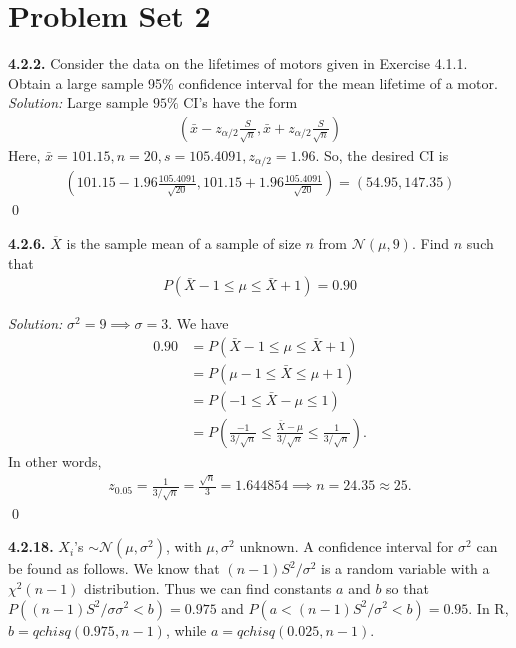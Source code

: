 \documentclass{book}
\theoremstyle{definition}
\newcommand{\nn}{\nonumber}
\newcommand{\N}{\mathcal{N}}
\newcommand{\f}[2]{\frac{#1}{#2}}
\newcommand{\lp}{\left(}
\newcommand{\rp}{\right)}
\begin{document}
\newpage

\section{Problem Set 2}




\noindent \textbf{4.2.2.} Consider the data on the lifetimes of motors given in Exercise 4.1.1. Obtain
a large sample 95\% confidence interval for the mean lifetime of a motor.\\

\noindent \textit{Solution:} Large sample $95\%$ CI's have the form
\begin{align}
(\bar{x}- z_{\alpha/2}\f{S}{\sqrt{n}} , \bar{x}+ z_{\alpha/2}\f{S}{\sqrt{n}})
\end{align}
Here, $\bar{x} = 101.15, n= 20, s = 105.4091, z_{\alpha/2} = 1.96$. So, the desired CI is
\begin{align}
(101.15- 1.96\f{105.4091}{\sqrt{20}} , 101.15+ 1.96\f{105.4091}{\sqrt{20}}) = \boxed{(54.95, 147.35)}
\end{align}\qed





\newpage
\noindent\textbf{4.2.6.} $\overline{X}$ is the sample mean of a sample of size $n$ from $\N(\mu,9)$. Find $n$ such that 
\begin{align}
P(\bar{X}-1\leq \mu \leq \bar{X}+1) = 0.90
\end{align}

\noindent \textit{Solution:}  $\sigma^2 = 9 \implies \sigma = 3$. We have
\begin{align}
0.90 &= P( \bar{X} - 1\leq \mu \leq \bar{X} + 1 )\nn\\
&= P\lp \mu - 1  \leq \bar{X} \leq \mu+1  \rp \nn\\
&= P\lp -1 \leq \bar{X} - \mu \leq 1  \rp\nn\\
&= P\lp \f{-1}{3/\sqrt{n}} \leq \f{\bar{X}-\mu}{3/\sqrt{n}} \leq \f{1}{3/\sqrt{n}} \rp.
\end{align} 
In other words,
\begin{align}
z_{0.05} = \f{1}{3/\sqrt{n}} = \f{\sqrt{n}}{3} = 1.644854 \implies n = 24.35 \approx\boxed{25}.
\end{align}\qed



\newpage
\noindent\textbf{4.2.18.} $X_i$'s $\sim \N(\mu,\sigma^2)$, with $\mu,\sigma^2$ unknown. A confidence interval for $\sigma^2$ can be found as follows.
We know that $(n-1)S^2/\sigma^2$ is a random variable with a $\chi^2(n−1)$ distribution. Thus
we can find constants $a$ and $b$ so that $P((n - 1)S^2/σ\sigma^2 < b)=0.975$ and $P(a <
(n - 1)S^2/\sigma^2 < b)=0.95$. In R, $b = qchisq(0.975,n-1)$, while $a = qchisq(0.025,n-1).$
\end{document}

